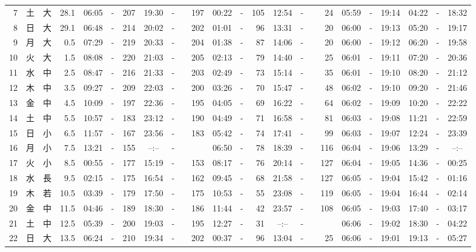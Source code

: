 \documentclass[12pt,a4j]{jsarticle}
\begin{document}
\begin{table}[htbp]
\begin{center}
{\begin{tabular}{|rc|cr|ccrccr|ccrccr|ccc|ccc|}
 7 & 土 & 大 & 28.1 &  06:05 &-& 207 &  19:30 &-& 197 &  00:22 &-& 105 &  12:54 &-&  24 & 05:59 & -& 19:14 & 04:22 & -& 18:32 \\
 8 & 日 & 大 & 29.1 &  06:48 &-& 214 &  20:02 &-& 202 &  01:01 &-&  96 &  13:31 &-&  20 & 06:00 & -& 19:13 & 05:20 & -& 19:17 \\
 9 & 月 & 大 &  0.5 &  07:29 &-& 219 &  20:33 &-& 204 &  01:38 &-&  87 &  14:06 &-&  20 & 06:00 & -& 19:12 & 06:20 & -& 19:58 \\
10 & 火 & 大 &  1.5 &  08:08 &-& 220 &  21:03 &-& 205 &  02:13 &-&  79 &  14:40 &-&  25 & 06:01 & -& 19:11 & 07:20 & -& 20:36 \\
11 & 水 & 中 &  2.5 &  08:47 &-& 216 &  21:33 &-& 203 &  02:49 &-&  73 &  15:14 &-&  35 & 06:01 & -& 19:10 & 08:20 & -& 21:12 \\
12 & 木 & 中 &  3.5 &  09:27 &-& 209 &  22:03 &-& 200 &  03:26 &-&  70 &  15:47 &-&  48 & 06:02 & -& 19:10 & 09:20 & -& 21:46 \\
13 & 金 & 中 &  4.5 &  10:09 &-& 197 &  22:36 &-& 195 &  04:05 &-&  69 &  16:22 &-&  64 & 06:02 & -& 19:09 & 10:20 & -& 22:22 \\
14 & 土 & 中 &  5.5 &  10:57 &-& 183 &  23:12 &-& 190 &  04:49 &-&  71 &  16:58 &-&  81 & 06:03 & -& 19:08 & 11:21 & -& 22:59 \\
15 & 日 & 小 &  6.5 &  11:57 &-& 167 &  23:56 &-& 183 &  05:42 &-&  74 &  17:41 &-&  99 & 06:03 & -& 19:07 & 12:24 & -& 23:39 \\
16 & 月 & 小 &  7.5 &  13:21 &-& 155 &  --:-- &-&~~~~~ &  06:50 &-&  78 &  18:39 &-& 116 & 06:04 & -& 19:06 & 13:29 & -& --:-- \\
17 & 火 & 小 &  8.5 &  00:55 &-& 177 &  15:19 &-& 153 &  08:17 &-&  76 &  20:14 &-& 127 & 06:04 & -& 19:05 & 14:36 & -& 00:25 \\
18 & 水 & 長 &  9.5 &  02:15 &-& 175 &  16:54 &-& 162 &  09:45 &-&  68 &  21:58 &-& 127 & 06:05 & -& 19:04 & 15:42 & -& 01:16 \\
19 & 木 & 若 & 10.5 &  03:39 &-& 179 &  17:50 &-& 175 &  10:53 &-&  55 &  23:08 &-& 119 & 06:05 & -& 19:04 & 16:44 & -& 02:14 \\
20 & 金 & 中 & 11.5 &  04:46 &-& 189 &  18:30 &-& 186 &  11:44 &-&  42 &  23:57 &-& 108 & 06:05 & -& 19:03 & 17:40 & -& 03:17 \\
21 & 土 & 中 & 12.5 &  05:39 &-& 200 &  19:03 &-& 195 &  12:27 &-&  31 &  --:-- &-&~~~~~ & 06:06 & -& 19:02 & 18:30 & -& 04:22 \\
22 & 日 & 大 & 13.5 &  06:24 &-& 210 &  19:34 &-& 202 &  00:37 &-&  96 &  13:04 &-&  25 & 06:06 & -& 19:01 & 19:13 & -& 05:27 \\

\end{tabular}}
\end{center}
\end{table}
\end{document}
